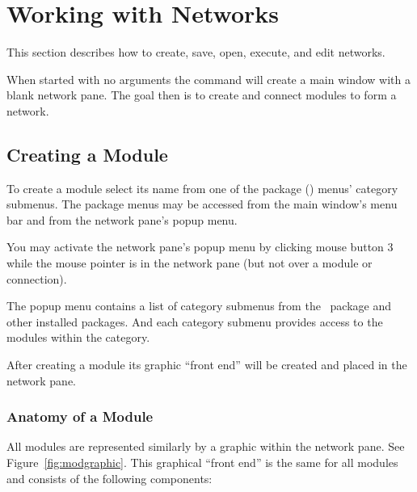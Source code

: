 %

  \newcommand{\modgraphic}%
  {\centerline{\epsfig{file=figures/modgraphic.eps,width=\columnwidth}}}
\begin{htmlonly}
  \newcommand{\srwindow}{%
  \htmladdimg[align=top,width="90%
  {../figures/modgraphic.gif}}
\end{htmlonly}

\section{Working with Networks}
\label{sec:workwithnets}

This section describes how to create, save, open, execute, and edit
networks.

When started with no arguments the  command will create a
main window with a blank network pane.  The goal then is to create and
connect modules to form a network.


\subsection{Creating a Module}
\label{sec:creatingmodules}

To create a module select its name from one of the package (\eg \sr)
menus' category submenus.  The package menus may be accessed from the main
window's menu bar and from the network pane's popup menu.

You may activate the network pane's popup menu by clicking mouse button 3
while the mouse pointer is in the network pane (but not over a module or
connection).  

The popup menu contains a list of category submenus from the \sr\ package
and other installed packages.  And each category submenu provides
access to the modules within the category.

After creating a module its graphic ``front end'' will be created and
placed in the network pane.

\subsubsection{Anatomy of a Module}
\label{sec:modanatomy}

All modules are represented similarly by a graphic within the network pane.
See Figure~\ref{fig:modgraphic}. This graphical ``front end'' is the same
for all modules and consists of the following components:

